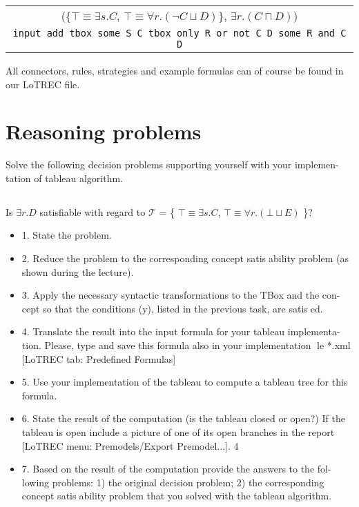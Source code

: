 \documentclass[11pt]{article} %
\begin{document}
\begin{table}[h]
\begin{center}
\begin{tabular}{c}
(\{$\top \equiv \exists s.C$, $\top \equiv \forall r.(\neg C \sqcup D)$\}, $\exists r.(C \sqcap D)$)\\
\texttt{input add tbox some S C tbox only R or not C D some R and C D}\\
\end{tabular}
\end{center}
\end{table}

All connectors, rules, strategies and example formulas can of course be found in our LoTREC file.

\section{Reasoning problems}
\label{sec:reasoning}

Solve the following decision problems supporting yourself with your implemen-
tation of tableau algorithm.

\subsection{}

\begin{center}
Is $\exists r.D$ satisfiable with regard to $\mathcal{T}$ = \{ $\top \equiv \exists s.C$, $\top \equiv \forall r.(\bot \sqcup E)$ \}?
\end{center}

\begin{itemize}

\item 1. State the problem.
\item 2. Reduce the problem to the corresponding concept satisability problem
(as shown during the lecture).
\item 3. Apply the necessary syntactic transformations to the TBox and the con-
cept so that the conditions (y), listed in the previous task, are satised.
\item 4. Translate the result into the input formula for your tableau implementa-
tion. Please, type and save this formula also in your implementation le
*.xml [LoTREC tab: Predefined Formulas]
\item 5. Use your implementation of the tableau to compute a tableau tree for this
formula.
\item 6. State the result of the computation (is the tableau closed or open?) If the
tableau is open include a picture of one of its open branches in the report
[LoTREC menu: Premodels/Export Premodel...].
4
\item 7. Based on the result of the computation provide the answers to the fol-
lowing problems: 1) the original decision problem; 2) the corresponding
concept satisability problem that you solved with the tableau algorithm.

\end{itemize}
\end{document}

